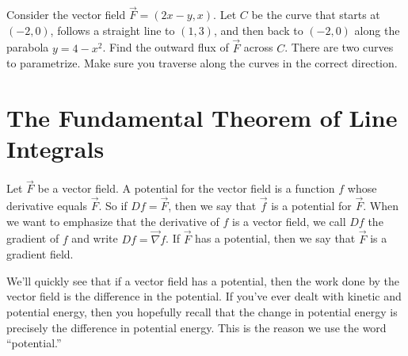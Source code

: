 \begin{problem}
 Consider the vector field $\vec F=(2x-y,x)$. Let $C$ be the curve that starts at $(-2,0)$, follows a straight line to $(1,3)$, and then back to $(-2,0)$ along the parabola $y=4-x^2$.  Find the outward flux of $\vec F$ across $C$. There are two curves to parametrize. Make sure you traverse along the curves in the correct direction.
\end{problem}


\section{The Fundamental Theorem of Line Integrals}

\begin{definition}
%
 Let $\vec F$ be a vector field.  A potential for the vector field is a function $f$ whose derivative equals $\vec F$. So if $Df=\vec F$, then we say that $\vec f$ is a potential for $\vec F$. When we want to emphasize that the derivative of $f$ is a vector field, we call $Df$ the gradient of $f$ and write $Df = \vec \nabla f$.
 If $\vec F$ has a potential, then we say that $\vec F$ is a gradient field. 
\end{definition}

We'll quickly see that if a vector field has a potential, then the work done by the vector field is the difference in the potential.  If you've ever dealt with kinetic and potential energy, then you hopefully recall that the change in potential energy is precisely the difference in potential energy.  This is the reason we use the word ``potential.''

